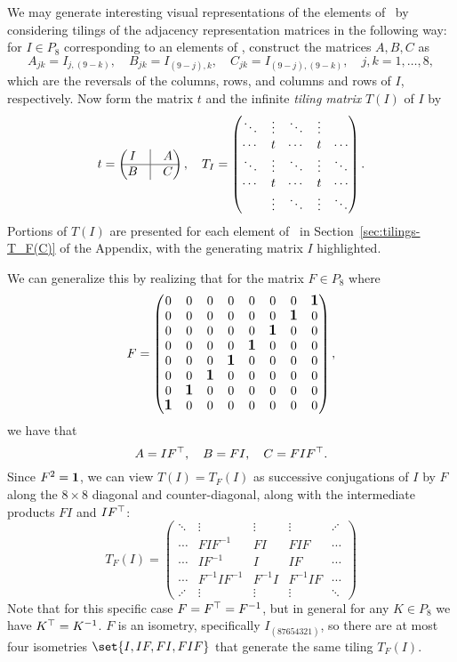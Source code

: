 We may generate interesting visual representations of the elements of \IsomC\ by considering
tilings of the adjacency representation matrices in the following way: for $I \in P_8$
corresponding to an elements of \IsomC, construct the matrices $A, B, C$ as
\[
A_{jk} = I_{j,(9-k)},\quad B_{jk} = I_{(9-j),k},\quad C_{jk} = I_{(9-j),(9-k)},\quad
j, k = 1,\dotsc,8,
\]
which are the reversals of the columns, rows, and columns and rows of $I$, respectively. Now
form the matrix $t$ and the infinite \emph{tiling matrix} $T(I)$ of $I$ by
\[
t = \begin{pmatrix}
I &\vline& A \\ \hline
B &\vline& C
\end{pmatrix},\quad
T_I = \begin{pmatrix}
\ddots&\vdots&\ddots&\vdots& \\
\cdots & t &\cdots& t & \cdots \\
\ddots&\vdots&\ddots&\vdots&\ddots \\
\cdots & t &\cdots& t & \cdots \\
&\vdots&\ddots&\vdots&\ddots
\end{pmatrix}.
\]
Portions of $T(I)$ are presented for each element of \IsomC\ in
Section~\ref{sec:tilings-T_F(C)} of the Appendix, with the generating matrix $I$ highlighted.

We can generalize this by realizing that for the matrix $F \in P_8$ where
\[
F = \begin{pmatrix}
0 & 0 & 0 & 0 & 0 & 0 & 0 & \text{\large$\mathbf{1}$} \\
0 & 0 & 0 & 0 & 0 & 0 & \text{\large$\mathbf{1}$} & 0 \\
0 & 0 & 0 & 0 & 0 & \text{\large$\mathbf{1}$} & 0 & 0 \\
0 & 0 & 0 & 0 & \text{\large$\mathbf{1}$} & 0 & 0 & 0 \\
0 & 0 & 0 & \text{\large$\mathbf{1}$} & 0 & 0 & 0 & 0 \\
0 & 0 & \text{\large$\mathbf{1}$} & 0 & 0 & 0 & 0 & 0 \\
0 & \text{\large$\mathbf{1}$} & 0 & 0 & 0 & 0 & 0 & 0 \\
\text{\large$\mathbf{1}$} & 0 & 0 & 0 & 0 & 0 & 0 & 0
\end{pmatrix},
\]
we have that
\[ A = I\trans F,\quad B = FI,\quad C = FI\trans F. \]
Since $F^2 = \mathbf{1}$, we can view $T(I) = T_F(I)$ as successive conjugations of $I$ by $F$
along the $8\times8$ diagonal and counter-diagonal, along with the intermediate products $FI$
and $I\trans F$:
\[
T_F(I) = \begin{pmatrix}
\ddots  & \vdots        & \vdots  & \vdots   & \iddots \\
\cdots  &      FIF^{-1} & FI      &      FIF & \cdots  \\
\cdots  &       IF^{-1} & I       &       IF & \cdots  \\
\cdots  & F^{-1}IF^{-1} & F^{-1}I & F^{-1}IF & \cdots  \\
\iddots & \vdots        & \vdots  & \vdots   & \ddots
\end{pmatrix}
\]
Note that for this specific case $F = \trans F = F^{-1}$, but in general for any $K \in P_8$
we have $\trans K = K^{-1}$. $F$ is an isometry, specifically $I_{(87654321)}$, so there are
at most four isometries $\set{I, IF, FI, FIF}$ that generate the same tiling $T_F(I)$.

